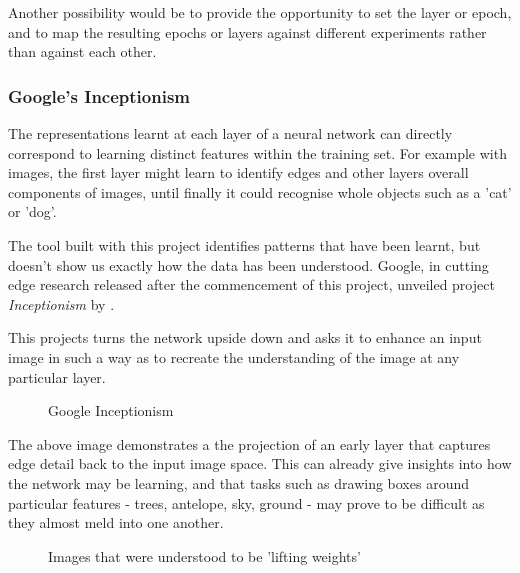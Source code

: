 \documentclass[a4paper,11pt,titlepage]{article}
\begin{document}
	Another possibility would be to provide the opportunity to set the layer or epoch, and to map the resulting epochs or layers against different experiments rather than against each other.	
	
\subsubsection{Google's Inceptionism}
	The representations learnt at each layer of a neural network can directly correspond to learning distinct features within the training set. For example with images, the first layer might learn to identify edges and other layers overall components of images, until finally it could recognise whole objects such as a 'cat' or 'dog'. 
	\par 
	The tool built with this project identifies patterns that have been learnt, but doesn't show us exactly how the data has been understood. Google, in cutting edge research released after the commencement of this project, unveiled project \textit{Inceptionism} by \cite{Mordvintsev2015}.
	\par 
	This projects turns the network upside down and asks it to enhance an input image in such a way as to recreate the understanding of the image at any particular layer.
	
	\begin{figure}[H]
    			\caption{Google Inceptionism}%
	\end{figure}	
	
	The above image demonstrates a the projection of an early layer that captures edge detail back to the input image space. This can already give insights into how the network may be learning, and that tasks such as drawing boxes around particular features - trees, antelope, sky, ground - may prove to be difficult as they almost meld into one another.
	
		\begin{figure}[H]
    			\caption{Images that were understood to be 'lifting weights'}%
	\end{figure}	
	
\end{document}
